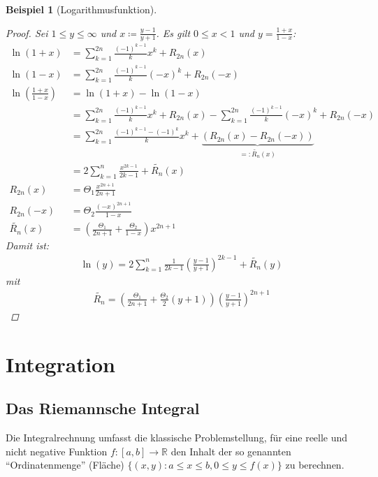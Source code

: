 \documentclass[ngerman,titlepage,twoside, parskip=half*]{scrreprt}
\newcommand*{\R}{\mathbb{R}}
\theoremstyle{break}
\theoremstyle{nonumberbreak}
\newtheorem{beispiel}{Beispiel}
\newtheorem{proof}{Beweis:}
\begin{document}
\begin{beispiel}[Logarithmusfunktion]
\begin{proof}
    Sei $1\leq y \leq\infty$ und $x\coloneqq\frac{y-1}{y+1}$. Es gilt
    $0\leq x<1$ und $y=\frac{1+x}{1-x}$:
    \begin{align*}
      \ln(1+x) &= \sum_{k=1}^{2n}\frac{(-1)^{k-1}}{k} x^k+ R_{2n}(x)\\
      \ln(1-x) &= \sum_{k=1}^{2n}\frac{(-1)^{k-1}}{k}(-x)^k+R_{2n}(-x)\\
      \ln\left(\frac{1+x}{1-x}\right) &= \ln(1+x)-\ln(1-x)\\
      &= \sum_{k=1}^{2n} \frac{(-1)^{k-1}}{k}x^k+R_{2n}(x)-
      \sum_{k=1}^{2n}\frac{(-1)^{k-1}}{k}(-x)^k+R_{2n}(-x)\\
      &= \sum_{k=1}^{2n}\frac{(-1)^{k-1}-(-1)^{k}}{k} x^k+
      \underbrace{(R_{2n} (x)-R_{2n}(-x))}_{=\colon\widetilde{R_n}(x)}\\
      &= 2\sum_{k=1}^n \frac{x^{2k-1}}{2k-1} +\widetilde{R_n}(x)\\
      R_{2n}(x)&= \Theta_1\frac{x^{2n+1}}{2n+1}\\
      R_{2n}(-x)&= \Theta_2\frac{(-x)^{2n+1}}{1-x}\\
      \widetilde{R_n}(x)&= \left(\frac{\Theta_1}{2n+1}+
        \frac{\Theta_2}{1-x}\right) x^{2n+1}
    \end{align*}
    Damit ist:
    \begin{gather*}
      \boxed{\ln(y)=2\sum_{k=1}^n\frac{1}{2k-1}\left( \frac{y-1}{y+1}
        \right)^{2k-1} +\widetilde{R_n}(y)}
    \end{gather*}
    mit
    \begin{gather*}
      \boxed{\widetilde{R_n}=\left(
          \frac{\Theta_1}{2n+1}+\frac{\Theta_2}{2} (y+1)\right)\left(
          \frac{y-1}{y+1} \right)^{2n+1}}
    \end{gather*}
  \end{proof}
\end{beispiel}

\chapter{Integration}
\section{Das Riemannsche Integral}
Die Integralrechnung umfasst die klassische Problemstellung, für eine
reelle und nicht negative Funktion $f\colon[a,b]\rightarrow\R$ den
Inhalt der so genannten "`Ordinatenmenge"' (Fläche) $\{(x,y)\colon
a\leq x\leq b, 0\leq y\leq f(x)\}$ zu berechnen.
\end{document}
